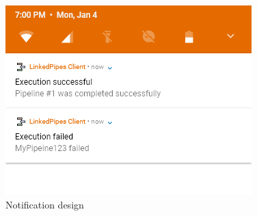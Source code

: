\begin{figure}\centering
    \begin{minipage}[b]{0.7\textwidth}
    	\includegraphics[width=\textwidth]{pics/xd/Notifications.png}
    	\caption[Notifications]{Notification design}\label{fig:xdNotifications}
    \end{minipage}
\end{figure}